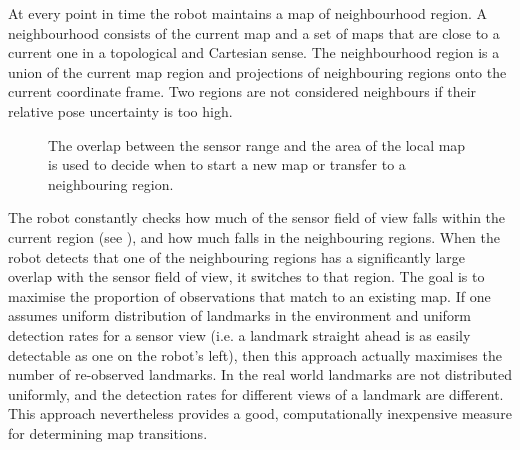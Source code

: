 At every point in time the robot maintains a map of neighbourhood
region. A neighbourhood consists of the current map and a set of maps
that are close to a current one in a topological and Cartesian sense.
The neighbourhood region is a union of the current map region and
projections of neighbouring regions onto the current coordinate frame.
Two regions are not considered neighbours if their relative pose
uncertainty is too high.

\begin{figure}
\begin{center}
\quad \quad \quad
{}\quad
{}
\end{center}
\caption[Map regions used for triggering transition events]
{The overlap between the sensor range and the area of the local 
 map is used to decide when to start a new map or transfer to a 
 neighbouring region.}
\label{fig:StartNew}
\end{figure}

The robot constantly checks how much of the sensor field of view falls
within the current region (see ), and how much
falls in the neighbouring regions. When the robot detects that one of
the neighbouring regions has a significantly large overlap with the
sensor field of view, it switches to that region. The goal is to
maximise the proportion of observations that match to an existing map.
If one assumes uniform distribution of landmarks in the environment
and uniform detection rates for a sensor view (i.e. a landmark
straight ahead is as easily detectable as one on the robot's left),
then this approach actually maximises the number of re-observed
landmarks. In the real world landmarks are not distributed uniformly,
and the detection rates for different views of a landmark are
different. This approach nevertheless provides a good, computationally
inexpensive measure for determining map transitions.

